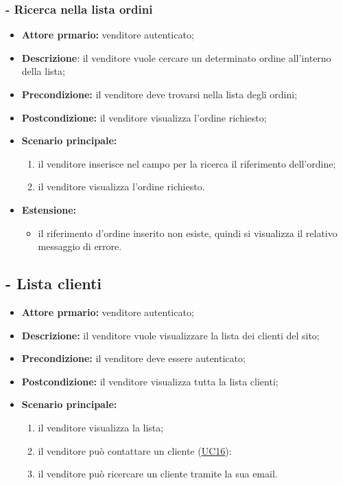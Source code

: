 \stepsubUserCase
\subsubsection{- Ricerca nella lista ordini}
\begin{itemize}
    \item \textbf{Attore prmario:} venditore autenticato;
    \item \textbf{Descrizione}: il venditore vuole cercare un determinato ordine all'interno della lista;
    \item \textbf{Precondizione:} il venditore deve trovarsi nella lista degli ordini;
    \item \textbf{Postcondizione:} il venditore visualizza l'ordine richiesto;
    \item \textbf{Scenario principale:}
        \begin{enumerate}
            \item il venditore inserisce nel campo per la ricerca il riferimento dell'ordine;
            \item il venditore visualizza l'ordine richiesto.
        \end{enumerate}
    \item \textbf{Estensione:}
    \begin{itemize}
        \item il riferimento d'ordine inserito non esiste, quindi si visualizza il relativo messaggio di errore.
    \end{itemize}
\end{itemize}

\stepUserCase
\subsection{ - Lista clienti}
\begin{itemize}
    \item \textbf{Attore prmario:} venditore autenticato;
    \item \textbf{Descrizione:} il venditore vuole visualizzare la lista dei clienti del sito;
    \item \textbf{Precondizione:} il venditore deve essere autenticato;
    \item \textbf{Postcondizione:} il venditore visualizza tutta la lista clienti;
    \item \textbf{Scenario principale:}
          \begin{enumerate}
              \item il venditore visualizza la lista;
              \item il venditore può contattare un cliente (\hyperref[UC16]{UC16}):
              \item il venditore può ricercare un cliente tramite la sua email.
          \end{enumerate}
\end{itemize}

